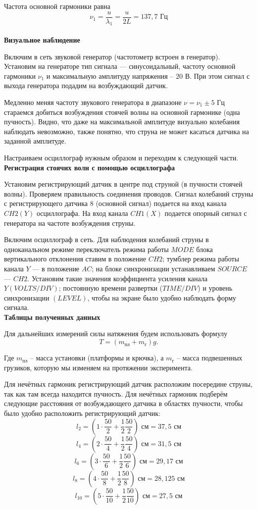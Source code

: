 \documentclass[a4paper,12pt]{article} %
\begin{document}
Частота основной гармоники равна 
\[\nu_1 = \frac{u}{\lambda_1} = \frac{u}{2L} = 137,7 \text{ Гц}\]\\

{\bf Визуальное наблюдение}

Включим в сеть звуковой генератор (частотометр встроен в генератор). Установим на генераторе тип сигнала — синусоидальный, частоту основной гармоники $\nu_1$ и
максимальную амплитуду напряжения -- $20$ В. При этом сигнал с выхода генератора подадим на возбуждающий датчик.

Медленно меняя частоту звукового генератора в диапазоне $\nu = \nu_1 \pm 5 \text{ Гц}$ стараемся добиться возбуждения стоячей волны на основной гармонике (одна пучность). Видно, что даже на максимальной амплитуде визуально колебания наблюдать невозможно, также понятно, что струна не может касаться датчика на заданной амплитуде.

Настраиваем осциллограф нужным образом и переходим к следующей части.\\

{\bf  Регистрация стоячих волн с помощью осциллографа}

Установим регистрирующий датчик в центре под струной (в пучности стоячей волны). Проверяем правильность соединения проводов. Сигнал колебаний струны с регистрирующего датчика $8$ (основной сигнал) подается на вход канала $CH2(Y)$ осциллографа. На вход канала $CH1(X)$ подается опорный сигнал с генератора на
частоте возбуждения струны.


Включим осциллограф в сеть. Для наблюдения колебаний струны в одноканальном режиме переключатель режима работы $MODE$ блока вертикального отклонения ставим в положение $CH2$; тумблер режима работы канала $Y$ — в положение $AC$;
на блоке синхронизации устанавливаем $SOURCE$ — $CH2$. Установим такие значения коэффициента усиления канала $Y (VOLTS/DIV)$; постоянную времени
развертки ($TIME/DIV$) и уровень синхронизации $(LEVEL)$, чтобы на экране
было удобно наблюдать форму сигнала. \\

{\bf Таблицы полученных данных}

Для дальнейших измерений силы натяжения будем использовать формулу \[ T = (m_{\text{пл}} + m_{\text{г}})g.\]

Где $m_{\text{пл}}$ -- масса установки (платформы и крючка), а $m_{\text{г}}$ -- масса подвешенных грузиков, которую мы изменяем на протяжении эксперимента.

Для нечётных гармоник регистрирующий датчик расположим посередине струны, так как там всегда находится пучность. Для нечётных гармоник подберём следующие расстояния от возбуждающего датчика в областях пучности, чтобы было удобно расположить регистрирующий датчик:
\[l_2 = (1\cdot\frac{50}{2} +  \frac{1}{2}\frac{50}{2})\text{ см} = 37,5\text{ см}\] 
\[l_4 = (2\cdot\frac{50}{4} +  \frac{1}{2}\frac{50}{4})\text{ см} = 31,5\text{ см}\] 
\[l_6 = (3\cdot\frac{50}{6} +  \frac{1}{2}\frac{50}{6})\text{ см} = 29,17\text{ см}\] 
\[l_8 = (4\cdot\frac{50}{8} +  \frac{1}{2}\frac{50}{8})\text{ см} = 28,125\text{ см}\] 
\[l_{10} = (5\cdot\frac{50}{10} +  \frac{1}{2}\frac{50}{10})\text{ см} = 27,5\text{ см}\] 
\end{document}
